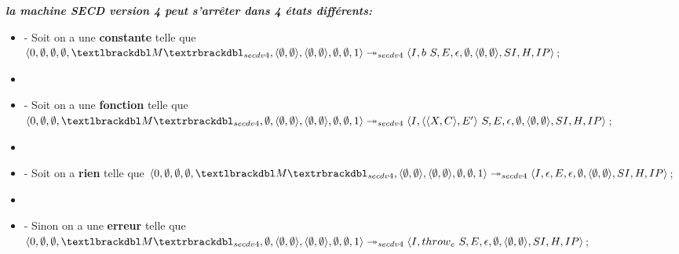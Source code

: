 \documentclass[10pt,a4paper]{report}
\begin{document}
\textbf{\textit{la machine SECD version 4 peut s'arrêter dans 4 états différents:}}
\smallbreak
\begin{itemize}
\item[] - Soit on a une \textbf{constante} telle que $\langle 0,\emptyset,\emptyset,\emptyset,\textlbrackdbl M\textrbrackdbl_{secdv4},\langle\emptyset,\emptyset\rangle,\langle\emptyset,\emptyset\rangle,\emptyset,\emptyset,1\rangle \\
  \twoheadrightarrow_{secdv4} \langle I,b~S,E,\epsilon,\emptyset,\langle\emptyset,\emptyset\rangle,SI,H,IP\rangle$;
\item[] 
\item[] - Soit on a une \textbf{fonction} telle que
  $\langle 0,\emptyset,\emptyset,\textlbrackdbl M\textrbrackdbl_{secdv4},\emptyset,\langle\emptyset,\emptyset\rangle,\langle\emptyset,\emptyset\rangle,\emptyset,\emptyset,1\rangle \\
  \twoheadrightarrow_{secdv4} \langle I,\langle\langle X,C\rangle,E'\rangle~S,E,\epsilon,\emptyset,\langle\emptyset,\emptyset\rangle,SI,H,IP\rangle$;
\item[] 
\item[] - Soit on a \textbf{rien} telle que $\langle 0,\emptyset,\emptyset,\emptyset,\textlbrackdbl M\textrbrackdbl_{secdv4},\langle\emptyset,\emptyset\rangle,\langle\emptyset,\emptyset\rangle,\emptyset,\emptyset,1\rangle \\
\twoheadrightarrow_{secdv4} \langle I,\epsilon,E,\epsilon,\emptyset,\langle\emptyset,\emptyset\rangle,SI,H,IP\rangle$;
\item[] 
\item[] - Sinon on a une \textbf{erreur} telle que 
  $\langle 0,\emptyset,\emptyset,\textlbrackdbl M\textrbrackdbl_{secdv4},\emptyset,\langle\emptyset,\emptyset\rangle,\langle\emptyset,\emptyset\rangle,\emptyset,\emptyset,1\rangle \\
  \twoheadrightarrow_{secdv4} \langle I,throw_{e}~S,E,\epsilon,\emptyset,\langle\emptyset,\emptyset\rangle,SI,H,IP\rangle$;
\end{itemize}
\end{document}
